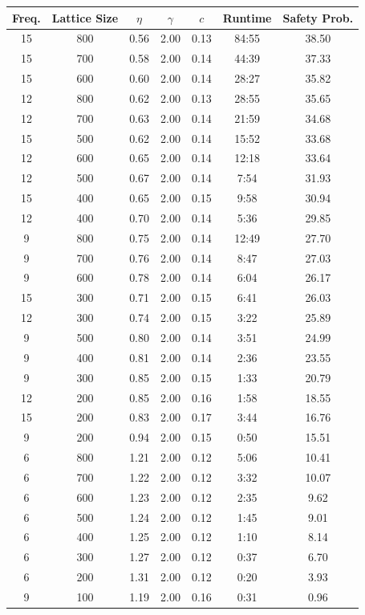 \begin{tabular}{ccccccc}
\toprule
Freq. & Lattice Size & $\eta$ & $\gamma$ & $c$ & Runtime & Safety Prob. \\
\midrule
15 & 800 & 0.56 & 2.00 & 0.13 & 84:55 & 38.50 \\
15 & 700 & 0.58 & 2.00 & 0.14 & 44:39 & 37.33 \\
15 & 600 & 0.60 & 2.00 & 0.14 & 28:27 & 35.82 \\
12 & 800 & 0.62 & 2.00 & 0.13 & 28:55 & 35.65 \\
12 & 700 & 0.63 & 2.00 & 0.14 & 21:59 & 34.68 \\
15 & 500 & 0.62 & 2.00 & 0.14 & 15:52 & 33.68 \\
12 & 600 & 0.65 & 2.00 & 0.14 & 12:18 & 33.64 \\
12 & 500 & 0.67 & 2.00 & 0.14 & 7:54 & 31.93 \\
15 & 400 & 0.65 & 2.00 & 0.15 & 9:58 & 30.94 \\
12 & 400 & 0.70 & 2.00 & 0.14 & 5:36 & 29.85 \\
9 & 800 & 0.75 & 2.00 & 0.14 & 12:49 & 27.70 \\
9 & 700 & 0.76 & 2.00 & 0.14 & 8:47 & 27.03 \\
9 & 600 & 0.78 & 2.00 & 0.14 & 6:04 & 26.17 \\
15 & 300 & 0.71 & 2.00 & 0.15 & 6:41 & 26.03 \\
12 & 300 & 0.74 & 2.00 & 0.15 & 3:22 & 25.89 \\
9 & 500 & 0.80 & 2.00 & 0.14 & 3:51 & 24.99 \\
9 & 400 & 0.81 & 2.00 & 0.14 & 2:36 & 23.55 \\
9 & 300 & 0.85 & 2.00 & 0.15 & 1:33 & 20.79 \\
12 & 200 & 0.85 & 2.00 & 0.16 & 1:58 & 18.55 \\
15 & 200 & 0.83 & 2.00 & 0.17 & 3:44 & 16.76 \\
9 & 200 & 0.94 & 2.00 & 0.15 & 0:50 & 15.51 \\
6 & 800 & 1.21 & 2.00 & 0.12 & 5:06 & 10.41 \\
6 & 700 & 1.22 & 2.00 & 0.12 & 3:32 & 10.07 \\
6 & 600 & 1.23 & 2.00 & 0.12 & 2:35 & 9.62 \\
6 & 500 & 1.24 & 2.00 & 0.12 & 1:45 & 9.01 \\
6 & 400 & 1.25 & 2.00 & 0.12 & 1:10 & 8.14 \\
6 & 300 & 1.27 & 2.00 & 0.12 & 0:37 & 6.70 \\
6 & 200 & 1.31 & 2.00 & 0.12 & 0:20 & 3.93 \\
9 & 100 & 1.19 & 2.00 & 0.16 & 0:31 & 0.96 \\
\bottomrule
\end{tabular}
